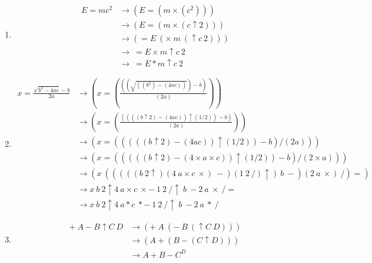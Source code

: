 \documentclass[12pt,letterpaper,fleqn]{article}
\begin{document}
\begin{enumerate}

\item \begin{align*}
  E = mc^2 &\rightarrow (E = (m \times (c^2))) \\
  &\rightarrow (E = (m \times (c \uparrow 2))) \\
  &\rightarrow (= E\ (\times\ m\ (\uparrow c\ 2))) \\
  &\rightarrow\ = E \times m \uparrow c\ 2 \\
  &\rightarrow\ = E * m \uparrow c\ 2
\end{align*}

\item \begin{align*}
  x = \frac{\sqrt{b^2 - 4ac} - b}{2a} &\rightarrow \left(x = \left(\frac{\left(\left(\sqrt{((b^2) - (4ac))}\right) - b\right)}{(2a)}\right)\right) \\
  &\rightarrow \left(x = \left(\frac{\left(\left(((b \uparrow 2) - (4ac)) \uparrow (1/2) \right) - b\right)}{(2a)}\right)\right) \\
  &\rightarrow (x = (((((b \uparrow 2) - (4ac)) \uparrow (1/2)) - b) / (2a))) \\
  &\rightarrow (x = (((((b \uparrow 2) - (4 \times a \times c)) \uparrow (1/2)) - b) / (2 \times a))) \\
  &\rightarrow (x\ (((((b\ 2 \uparrow) (4\ a \times c\ \times)\ -) (1\ 2\ /) \uparrow)\ b\ -) (2\ a\ \times)\ /) =) \\
  &\rightarrow x\ b\ 2 \uparrow 4\ a \times c\ \times -\ 1\ 2\ / \uparrow\ b\ - 2\ a\ \times\ / = \\
  &\rightarrow x\ b\ 2 \uparrow 4\ a * c\ * -\ 1\ 2\ / \uparrow\ b\ - 2\ a\ *\ /
\end{align*}

\item \begin{align*}
  +\ A - B \uparrow C\ D &\rightarrow (+\ A\ (-\ B\ (\uparrow C\ D))) \\
  &\rightarrow (A + (B - (C \uparrow D))) \\
  &\rightarrow A + B - C^D
\end{align*}

\end{enumerate}
\end{document}
